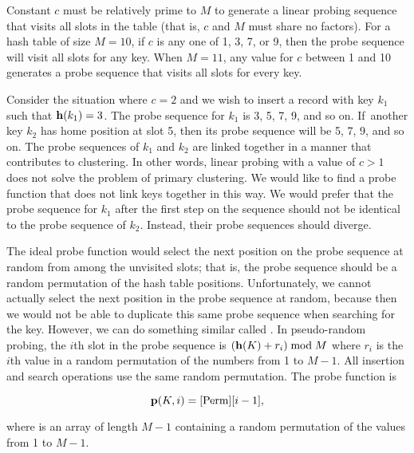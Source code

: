 Constant \(c\) must be relatively prime to \(M\) to generate a
linear probing sequence that visits all slots in the table
(that is, \(c\) and \(M\) must share no factors).
For a hash table of size \(M = 10\), if \(c\)
is any one of 1, 3, 7, or 9,
then the probe sequence will visit all slots for any key.
When \(M = 11\), any value for \(c\) between 1 and 10 generates a
probe sequence that visits all slots for every key.

Consider the situation where \(c = 2\) and we wish to insert a record
with key \(k_1\) such that \({\bf h}(k_1) = 3\).
The probe sequence for  \(k_1\) is 3, 5, 7, 9, and so on.
If~another key \(k_2\) has home position at slot 5, then its probe
sequence will be 5, 7, 9, and so on.
The probe sequences of \(k_1\) and \(k_2\) are linked
together in a manner that contributes to clustering.
In other words, linear probing with a value of \(c > 1\) does not
solve the problem of
primary clustering.
We would like to find a probe function that does not link
keys together in this way.
We would prefer that the probe sequence for \(k_1\) after the first step
on the sequence should not be identical to the probe sequence of
\(k_2\).
Instead, their probe sequences should diverge.

The ideal probe function would select
the next position on the probe
sequence at random from among the unvisited slots; that is, the probe
sequence should be a random permutation of the hash table positions.
Unfortunately, we cannot actually select the next position in the
probe sequence at random, because then we would not be able to duplicate
this same probe sequence when searching for the key.
However, we can do something similar called
.
In pseudo-random probing, the \(i\)th slot in the probe sequence is
\(({\bf h}(K) + r_i) \bmod M\)
where \(r_i\) is the \(i\)th value in a random permutation of
the numbers from 1 to \(M-1\).
All insertion and search operations use the same random
permutation.
The probe function is

\vspace{-\medskipamount}
\vspace{-\smallskipamount}
\[ {\bf p}(K, i) = \Cref{Perm}[i-1],\]

\vspace{-\medskipamount}
\noindent where  is an array of length \(M-1\) containing a
random permutation of the values from 1 to \(M - 1\).

